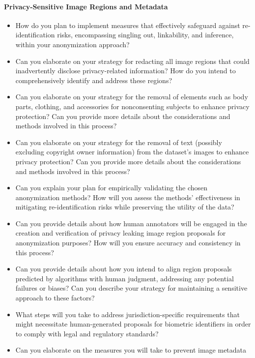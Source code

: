 \paragraph{Privacy-Sensitive Image Regions and Metadata} 
\begin{itemize}
    \item How do you plan to implement measures that effectively safeguard against
    re-identification risks, encompassing singling out, linkability, and inference,
    within your anonymization approach?
    \item Can you elaborate on your strategy for redacting all image regions that could
    inadvertently disclose privacy-related information? How do you intend to
    comprehensively identify and address these regions?
    \item Can you elaborate on your strategy for the removal of elements such as body
    parts, clothing, and accessories for nonconsenting subjects to enhance privacy
    protection? Can you provide more details about the considerations and methods
    involved in this process?
    \item Can you elaborate on your strategy for the removal of text (possibly
    excluding copyright owner information) from the dataset's images to enhance
    privacy protection? Can you provide more details about the considerations and
    methods involved in this process?
    \item Can you explain your plan for empirically validating the chosen anonymization
    methods? How will you assess the methods' effectiveness in mitigating
    re-identification risks while preserving the utility of the data?
    \item Can you provide details about how human annotators will be engaged in the
    creation and verification of privacy leaking image region proposals for
    anonymization purposes? How will you ensure accuracy and consistency in this process?
    \item Can you provide details about how you intend to align region proposals
    predicted by algorithms with human judgment, addressing any potential failures or
    biases? Can you describe your strategy for maintaining a sensitive approach to
    these factors?
    \item What steps will you take to address jurisdiction-specific requirements that
    might necessitate human-generated proposals for biometric identifiers in order to
    comply with legal and regulatory standards?
    \item Can you elaborate on the measures you will take to prevent image metadata

\end{itemize}

